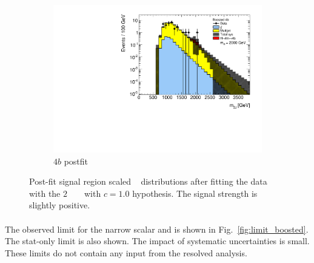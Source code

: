 \begin{figure}[htbp!]
\begin{subfigure}[b]{0.25\textwidth}
        \includegraphics[width=\textwidth,angle=-90]{figures/boosted/results/postfitplot_s_2000_b4b.pdf}
        \caption{$4b$ postfit}
        \label{fig:postfit4b}
    \end{subfigure}
\caption{Post-fit signal region scaled \mtwoJ~ distributions after fitting the data with the $2$ \TeV~ \Grav~ with $c=1.0$ hypothesis. The signal strength is slightly positive.}
\label{fig:postfit2000}
\end{figure}

\paragraph{}
The observed limit for the narrow scalar and \Grav is shown in Fig.~\ref{fig:limit_boosted}.
The stat-only limit is also shown. The impact of systematic uncertainties is small. 
These limits do not contain any input from the resolved analysis.

